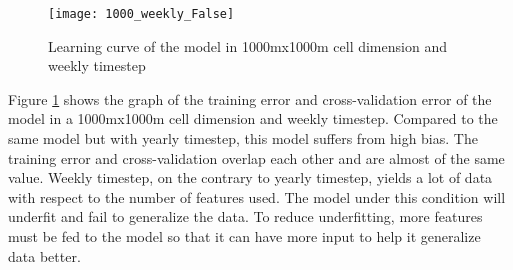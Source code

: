     \begin{figure}[H]
      \centering
      \texttt{[image: 1000\_weekly\_False]}
      \caption{Learning curve of the model in 1000mx1000m cell dimension and weekly timestep}
      \label{fig:learning-curve2}
    \end{figure}
    Figure \ref{fig:learning-curve2} shows the graph of the training error and cross-validation error of the model in a 1000mx1000m cell dimension and weekly timestep. Compared to the same model but with yearly timestep, this model suffers from high bias. The training error and cross-validation overlap each other and are almost of the same value. Weekly timestep, on the contrary to yearly timestep, yields a lot of data with respect to the number of features used. The model under this condition will underfit and fail to generalize the data. To reduce underfitting, more features must be fed to the model so that it can have more input to help it generalize data better.
